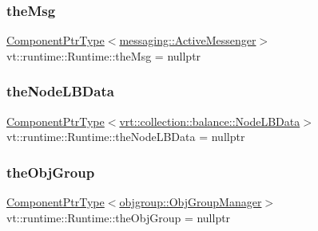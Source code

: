 \subsubsection{\texorpdfstring{the\+Msg}{theMsg}}
{\footnotesize\ttfamily \hyperlink{structvt_1_1runtime_1_1_runtime_a0893bf0a8c03b898e8ab66b52cec80ad}{Component\+Ptr\+Type}$<$\hyperlink{structvt_1_1messaging_1_1_active_messenger}{messaging\+::\+Active\+Messenger}$>$ vt\+::runtime\+::\+Runtime\+::the\+Msg = nullptr}

\mbox{\label{structvt_1_1runtime_1_1_runtime_a0a596fabff7d26a9417e8f7886410eee}} 
\subsubsection{\texorpdfstring{the\+Node\+L\+B\+Data}{theNodeLBData}}
{\footnotesize\ttfamily \hyperlink{structvt_1_1runtime_1_1_runtime_a0893bf0a8c03b898e8ab66b52cec80ad}{Component\+Ptr\+Type}$<$\hyperlink{structvt_1_1vrt_1_1collection_1_1balance_1_1_node_l_b_data}{vrt\+::collection\+::balance\+::\+Node\+L\+B\+Data}$>$ vt\+::runtime\+::\+Runtime\+::the\+Node\+L\+B\+Data = nullptr}

\mbox{\label{structvt_1_1runtime_1_1_runtime_af2d01d5059edf4aed086f087e5ed1e91}} 
\subsubsection{\texorpdfstring{the\+Obj\+Group}{theObjGroup}}
{\footnotesize\ttfamily \hyperlink{structvt_1_1runtime_1_1_runtime_a0893bf0a8c03b898e8ab66b52cec80ad}{Component\+Ptr\+Type}$<$\hyperlink{structvt_1_1objgroup_1_1_obj_group_manager}{objgroup\+::\+Obj\+Group\+Manager}$>$ vt\+::runtime\+::\+Runtime\+::the\+Obj\+Group = nullptr}

\mbox{\label{structvt_1_1runtime_1_1_runtime_a3001881d47dc04ed4e77a1e183dd970e}} 
